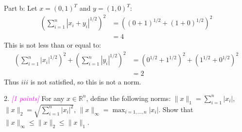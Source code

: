 \documentclass{article}
\newcommand{\field}[1]{\mathbb{#1}}
\newcommand{\1}{\mathbf{1}}
\newcommand{\R}{\field{R}} %
\newcommand{\grade}[1]{\small\textcolor{magenta}{\emph{[#1 points]}} \normalsize}
\begin{document}
Part b:
    Let $ x = (0,1)^T$ and $y=(1,0)^T$:
    \begin{align}
        \left(\sum_{i=1}^n |x_i+y_i|^{1/2}\right)^2 & = ((0+1)^{1/2} + (1+0)^{1/2})^2 \\
        & = 4
    \end{align}
    This is not less than or equal to:
    \begin{align}
        \left(\sum_{i=1}^n |x_i|^{1/2}\right)^2 + \left(\sum_{i=1}^n |y_i|^{1/2}\right)^2 & = (0^{1/2} + 1^{1/2})^2 + (1^{1/2} + 0^{1/2})^2\\
        & = 2
    \end{align}
    Thus $iii$ is not satisfied, so this is not a norm. \\
\newpage









{\color{blue}
2. \grade{1} For any $x \in \R^n$, define the following norms: $\|x\|_1 = \sum_{i=1}^n |x_i|$, $\|x\|_2 = \sqrt{\sum_{i=1}^n |x_i|^2}$, $\|x\|_\infty = \max_{i=1,\dots,n} |x_i|$. Show that $\|x\|_\infty \leq \|x\|_2 \leq \|x\|_1$.\\
}
\end{document}
